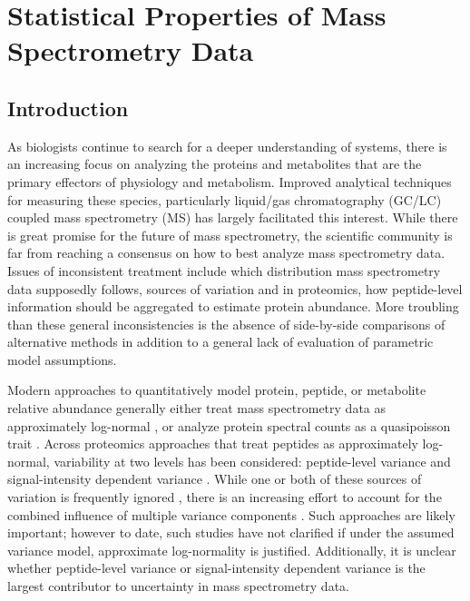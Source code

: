 \section{Statistical Properties of Mass Spectrometry Data}

\subsection{Introduction}

As biologists continue to search for a deeper understanding of systems, there is an increasing focus on analyzing the proteins and metabolites that are the primary effectors of physiology and metabolism. Improved analytical techniques for measuring these species, particularly liquid/gas chromatography (GC/LC) coupled mass spectrometry (MS) has largely facilitated this interest. While there is great promise for the future of mass spectrometry, the scientific community is far from reaching a consensus on how to best analyze mass spectrometry data.  Issues of inconsistent treatment include which distribution mass spectrometry data supposedly follows, sources of variation and in proteomics, how peptide-level information should be aggregated to estimate protein abundance. More troubling than these general inconsistencies is the absence of side-by-side comparisons of alternative methods in addition to a general lack of evaluation of parametric model assumptions. 

Modern approaches to quantitatively model protein, peptide, or metabolite relative abundance generally either treat mass spectrometry data as approximately log-normal \cite{Cox:2008ir, Oberg:2012bm,Navarro:2014ke, Breunig:2014bu}, or analyze protein spectral counts as a quasipoisson trait \cite{Li:2010bj}. Across proteomics approaches that treat peptides as approximately log-normal, variability at two levels has been considered: peptide-level variance \cite{Navarro:2014ke} and signal-intensity dependent variance \cite{Zhu:2011jr,Oberg:2012bm,Navarro:2014ke}. While one or both of these sources of variation is frequently ignored \cite{Oberg:2012bm}, there is an increasing effort to account for the combined influence of multiple variance components \cite{Navarro:2014ke}. Such approaches are likely important; however to date, such studies have not clarified if under the assumed variance model, approximate log-normality is justified. Additionally, it is unclear whether peptide-level variance or signal-intensity dependent variance is the largest contributor to uncertainty in mass spectrometry data.

